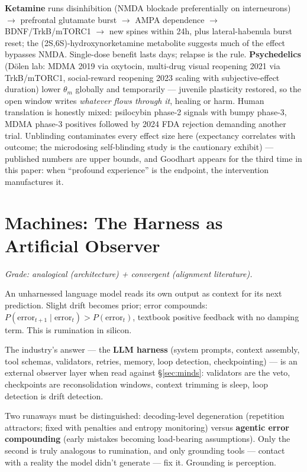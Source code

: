 \documentclass[11pt]{article}
\begin{document}
\textbf{Ketamine} runs disinhibition (NMDA blockade preferentially on interneurons) $\to$ prefrontal glutamate burst $\to$ AMPA dependence $\to$ BDNF/TrkB/mTORC1 $\to$ new spines within 24h, plus lateral-habenula burst reset; the (2S,6S)-hydroxynorketamine metabolite suggests much of the effect bypasses NMDA. Single-dose benefit lasts days; relapse is the rule. \textbf{Psychedelics} (D\"olen lab: MDMA 2019 via oxytocin, multi-drug visual reopening 2021 via TrkB/mTORC1, social-reward reopening 2023 scaling with subjective-effect duration) lower $\theta_m$ globally and temporarily --- juvenile plasticity restored, so the open window writes \emph{whatever flows through it}, healing or harm. Human translation is honestly mixed: psilocybin phase-2 signals with bumpy phase-3, MDMA phase-3 positives followed by 2024 FDA rejection demanding another trial. Unblinding contaminates every effect size here (expectancy correlates with outcome; the microdosing self-blinding study is the cautionary exhibit) --- published numbers are upper bounds, and Goodhart appears for the third time in this paper: when ``profound experience'' is the endpoint, the intervention manufactures it.

\section{Machines: The Harness as Artificial Observer}
\label{sec:machines}

\textit{Grade: analogical (architecture) + convergent (alignment literature).}

An unharnessed language model reads its own output as context for its next prediction. Slight drift becomes prior; error compounds: $P(\text{error}_{t+1} \mid \text{error}_t) > P(\text{error}_t)$, textbook positive feedback with no damping term. This is rumination in silicon.

The industry's answer --- the \textbf{LLM harness} (system prompts, context assembly, tool schemas, validators, retries, memory, loop detection, checkpointing) --- is an external observer layer when read against \S\ref{sec:minds}: validators are the veto, checkpoints are reconsolidation windows, context trimming is sleep, loop detection is drift detection.

Two runaways must be distinguished: decoding-level degeneration (repetition attractors; fixed with penalties and entropy monitoring) versus \textbf{agentic error compounding} (early mistakes becoming load-bearing assumptions). Only the second is truly analogous to rumination, and only grounding tools --- contact with a reality the model didn't generate --- fix it. Grounding is perception.
\end{document}
